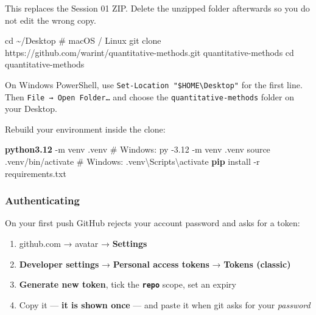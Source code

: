 \documentclass[
  letterpaper,
  10pt,
  twoside,
  openright,
  numbers=noenddot,
  chapterprefix=true]{scrbook}
\newenvironment{Shaded}{}{}
\newcommand{\AttributeTok}[1]{\textcolor[rgb]{0.84,0.23,0.29}{#1}}
\newcommand{\BuiltInTok}[1]{\textcolor[rgb]{0.84,0.23,0.29}{#1}}
\newcommand{\CommentTok}[1]{\textcolor[rgb]{0.42,0.45,0.49}{#1}}
\newcommand{\ExtensionTok}[1]{\textcolor[rgb]{0.84,0.23,0.29}{\textbf{#1}}}
\newcommand{\FunctionTok}[1]{\textcolor[rgb]{0.44,0.26,0.76}{#1}}
\newcommand{\NormalTok}[1]{\textcolor[rgb]{0.14,0.16,0.18}{#1}}
\providecommand{\tightlist}{%
  \setlength{\itemsep}{0pt}\setlength{\parskip}{0pt}}
\begin{document}
This replaces the Session 01 ZIP. Delete the unzipped folder afterwards
so you do not edit the wrong copy.

\begin{Shaded}
\begin{Highlighting}[]
\BuiltInTok{cd}\NormalTok{ \textasciitilde{}/Desktop                         }\CommentTok{\# macOS / Linux}
\FunctionTok{git}\NormalTok{ clone https://github.com/warint/quantitative{-}methods.git quantitative{-}methods}
\BuiltInTok{cd}\NormalTok{ quantitative{-}methods}
\end{Highlighting}
\end{Shaded}

On Windows PowerShell, use
\texttt{Set-Location\ "\$HOME\textbackslash{}Desktop"} for the first
line. Then \texttt{File\ →\ Open\ Folder…} and choose the
\texttt{quantitative-methods} folder on your Desktop.

Rebuild your environment inside the clone:

\begin{Shaded}
\begin{Highlighting}[]
\ExtensionTok{python3.12} \AttributeTok{{-}m}\NormalTok{ venv .venv           }\CommentTok{\# Windows: py {-}3.12 {-}m venv .venv}
\BuiltInTok{source}\NormalTok{ .venv/bin/activate          }\CommentTok{\# Windows: .venv\textbackslash{}Scripts\textbackslash{}activate}
\ExtensionTok{pip}\NormalTok{ install }\AttributeTok{{-}r}\NormalTok{ requirements.txt}
\end{Highlighting}
\end{Shaded}

\subsubsection{Authenticating}\label{authenticating}

On your first push GitHub rejects your account password and asks for a
token:

\begin{enumerate}
\def\labelenumi{\arabic{enumi}.}
\tightlist
\item
  github.com → avatar → \textbf{Settings}
\item
  \textbf{Developer settings} → \textbf{Personal access tokens} →
  \textbf{Tokens (classic)}
\item
  \textbf{Generate new token}, tick the \textbf{\texttt{repo}} scope,
  set an expiry
\item
  Copy it --- \textbf{it is shown once} --- and paste it when git asks
  for your \emph{password}
\end{enumerate}
\end{document}
